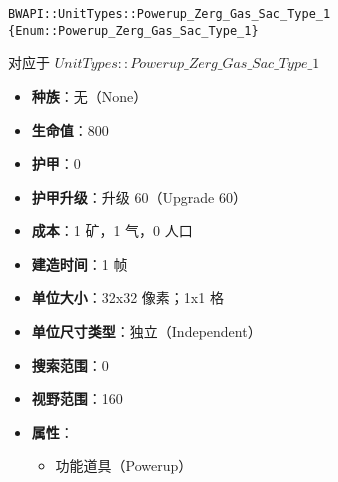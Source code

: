 \begin{tcolorbox}[colback=white, colframe=black!60!white, title=Powerup\_Zerg\_Gas\_Sac\_Type\_1(), arc=0mm]
    \begin{verbatim}
BWAPI::UnitTypes::Powerup_Zerg_Gas_Sac_Type_1 {Enum::Powerup_Zerg_Gas_Sac_Type_1}
    \end{verbatim}
    对应于  $UnitTypes::Powerup\_Zerg\_Gas\_Sac\_Type\_1$ 
    \begin{itemize}
        \item \textbf{种族}：无（None）
        \item \textbf{生命值}：800
        \item \textbf{护甲}：0
        \item \textbf{护甲升级}：升级 60（Upgrade 60）
        \item \textbf{成本}：1 矿，1 气，0 人口
        \item \textbf{建造时间}：1 帧
        \item \textbf{单位大小}：32x32 像素；1x1 格
        \item \textbf{单位尺寸类型}：独立（Independent）
        \item \textbf{搜索范围}：0
        \item \textbf{视野范围}：160
        \item \textbf{属性}：
            \begin{itemize}
                \item 功能道具（Powerup）
            \end{itemize}
    \end{itemize}
\end{tcolorbox}

